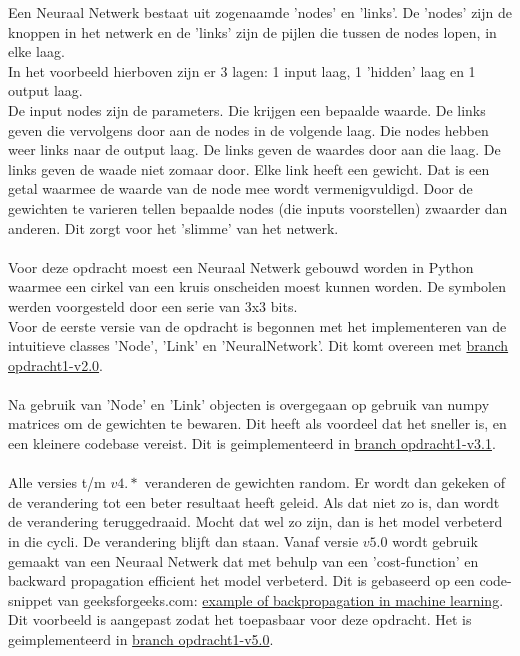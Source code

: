 \documentclass{article} %
\begin{document}
            Een Neuraal Netwerk bestaat uit zogenaamde 'nodes' en 'links'. De 'nodes' zijn de knoppen in het netwerk en de 'links' zijn de pijlen die tussen de nodes lopen, in elke laag. \\
            In het voorbeeld hierboven zijn er 3 lagen: 1 input laag, 1 'hidden' laag en 1 output laag. \\
            De input nodes zijn de parameters. Die krijgen een bepaalde waarde. De links geven die vervolgens door aan de nodes in de volgende laag. Die nodes hebben weer links naar de output laag. De links geven de waardes door aan die laag. De links geven de waade niet zomaar door. Elke link heeft een gewicht. Dat is een getal waarmee de waarde van de node mee wordt vermenigvuldigd. Door de gewichten te varieren tellen bepaalde nodes (die inputs voorstellen) zwaarder dan anderen. Dit zorgt voor het 'slimme' van het netwerk. \\ \\
            Voor deze opdracht moest een Neuraal Netwerk gebouwd worden in Python waarmee een cirkel van een kruis onscheiden moest kunnen worden. De symbolen werden voorgesteld door een serie van 3x3 bits. \\
            Voor de eerste versie van de opdracht is begonnen met het implementeren van de intuitieve classes 'Node', 'Link' en 'NeuralNetwork'. Dit komt overeen met \href{https://github.com/tdregmans/TINLML02-persoonlijk-verslag/tree/opdracht1-v2.0/opdracht1}{branch opdracht1-v2.0}. \\ \\
            Na gebruik van 'Node' en 'Link' objecten is overgegaan op gebruik van numpy matrices om de gewichten te bewaren. Dit heeft als voordeel dat het sneller is, en een kleinere codebase vereist. Dit is geimplementeerd in \href{https://github.com/tdregmans/TINLML02-persoonlijk-verslag/tree/opdracht1-v3.1/opdracht1}{branch opdracht1-v3.1}. \\ \\
            Alle versies t/m \(v4.*\) veranderen de gewichten random. Er wordt dan gekeken of de verandering tot een beter resultaat heeft geleid. Als dat niet zo is, dan wordt de verandering teruggedraaid. Mocht dat wel zo zijn, dan is het model verbeterd in die cycli. De verandering blijft dan staan. Vanaf versie \(v5.0\) wordt gebruik gemaakt van een Neuraal Netwerk dat met behulp van een 'cost-function' en backward propagation efficient het model verbeterd. Dit is gebaseerd op een code-snippet van geeksforgeeks.com: \href{https://www.geeksforgeeks.org/backpropagation-in-machine-learning/#example-of-backpropagation-in-machine-learning}{example of backpropagation in machine learning}. Dit voorbeeld is aangepast zodat het toepasbaar voor deze opdracht. Het is geimplementeerd in \href{https://github.com/tdregmans/TINLML02-persoonlijk-verslag/tree/opdracht1-v5.0/opdracht1}{branch opdracht1-v5.0}. \\
\end{document}
